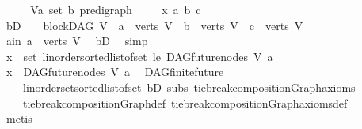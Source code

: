 \begin{isabellebody}
\isamarkupfalse%
\ \isanewline
\ \ \isamarkupfalse%
\ V{\isacharcolon}{\kern0pt}{\isacharcolon}{\kern0pt}{\isachardoublequoteopen}{\isacharparenleft}{\kern0pt}{\isacharprime}{\kern0pt}a\ set{\isacharcomma}{\kern0pt}\ {\isacharprime}{\kern0pt}b{\isacharparenright}{\kern0pt}\ pre{\isacharunderscore}{\kern0pt}digraph{\isachardoublequoteclose}\ \isanewline
\ \ \isamarkupfalse%
\ x\ a\ b\ c\isanewline
\ \ \isamarkupfalse%
\ bD{\isacharcolon}{\kern0pt}\ {\isachardoublequoteopen}\ {\isasymnot}\ {\isacharparenleft}{\kern0pt}{\isasymnot}\ blockDAG\ V\ {\isasymor}\ a\ {\isasymnotin}\ verts\ V\ {\isasymor}\ b\ {\isasymnotin}\ verts\ V\ {\isasymor}\ c\ {\isasymnotin}\ verts\ V{\isacharparenright}{\kern0pt}{\isachardoublequoteclose}\isanewline
\ \ \isamarkupfalse%
\ \isamarkupfalse%
\ a{\isacharunderscore}{\kern0pt}in{\isacharcolon}{\kern0pt}\ {\isachardoublequoteopen}a\ {\isasymin}\ verts\ V{\isachardoublequoteclose}\ \isamarkupfalse%
\ bD\ \isamarkupfalse%
\ simp\isanewline
\ \ \isamarkupfalse%
\ {\isachardoublequoteopen}x\ {\isasymin}\ set\ {\isacharparenleft}{\kern0pt}linorder{\isachardot}{\kern0pt}sorted{\isacharunderscore}{\kern0pt}list{\isacharunderscore}{\kern0pt}of{\isacharunderscore}{\kern0pt}set\ le\ {\isacharparenleft}{\kern0pt}DAG{\isachardot}{\kern0pt}future{\isacharunderscore}{\kern0pt}nodes\ V\ a{\isacharparenright}{\kern0pt}{\isacharparenright}{\kern0pt}{\isachardoublequoteclose}\isanewline
\ \ \isamarkupfalse%
\ \isamarkupfalse%
\ {\isachardoublequoteopen}x\ {\isasymin}\ DAG{\isachardot}{\kern0pt}future{\isacharunderscore}{\kern0pt}nodes\ V\ a{\isachardoublequoteclose}\ \isamarkupfalse%
\ DAG{\isachardot}{\kern0pt}finite{\isacharunderscore}{\kern0pt}future\isanewline
\ \ \ \ linorder{\isachardot}{\kern0pt}set{\isacharunderscore}{\kern0pt}sorted{\isacharunderscore}{\kern0pt}list{\isacharunderscore}{\kern0pt}of{\isacharunderscore}{\kern0pt}set\ bD\ subs\ tie{\isacharunderscore}{\kern0pt}break{\isacharunderscore}{\kern0pt}compositionGraph{\isacharunderscore}{\kern0pt}axioms\ \isanewline
\ \ \ \ tie{\isacharunderscore}{\kern0pt}break{\isacharunderscore}{\kern0pt}compositionGraph{\isacharunderscore}{\kern0pt}def\ tie{\isacharunderscore}{\kern0pt}break{\isacharunderscore}{\kern0pt}compositionGraph{\isacharunderscore}{\kern0pt}axioms{\isacharunderscore}{\kern0pt}def\isanewline
\ \ \ \ \isamarkupfalse%
\ metis\isanewline
\ \ \isamarkupfalse%

\end{isabellebody}
